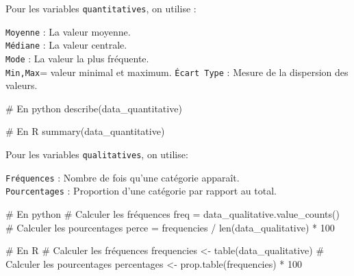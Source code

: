 \documentclass[
  letterpaper,
  DIV=11,
  numbers=noendperiod]{scrartcl}
\newenvironment{Shaded}{\begin{snugshade}}{\end{snugshade}}
\newcommand{\CommentTok}[1]{\textcolor[rgb]{0.37,0.37,0.37}{#1}}
\newcommand{\DecValTok}[1]{\textcolor[rgb]{0.68,0.00,0.00}{#1}}
\newcommand{\FunctionTok}[1]{\textcolor[rgb]{0.28,0.35,0.67}{#1}}
\newcommand{\NormalTok}[1]{\textcolor[rgb]{0.00,0.23,0.31}{#1}}
\newcommand{\OtherTok}[1]{\textcolor[rgb]{0.00,0.23,0.31}{#1}}
\newcommand{\SpecialCharTok}[1]{\textcolor[rgb]{0.37,0.37,0.37}{#1}}
\begin{document}
Pour les variables \texttt{quantitatives}, on utilise :

\texttt{Moyenne} : La valeur moyenne.\\
\texttt{Médiane} : La valeur centrale.\\
\texttt{Mode} : La valeur la plus fréquente.\\
\texttt{Min,Max}= valeur minimal et maximum. \texttt{Écart\ Type} :
Mesure de la dispersion des valeurs.

\begin{Shaded}
\begin{Highlighting}[]
\CommentTok{\# En python}
\FunctionTok{describe}\NormalTok{(data\_quantitative)}
\end{Highlighting}
\end{Shaded}

\begin{Shaded}
\begin{Highlighting}[]
\CommentTok{\# En R }
\FunctionTok{summary}\NormalTok{(data\_quantitative)}
\end{Highlighting}
\end{Shaded}

Pour les variables \texttt{qualitatives}, on utilise:

\texttt{Fréquences} : Nombre de fois qu'une catégorie apparaît.\\
\texttt{Pourcentages} : Proportion d'une catégorie par rapport au total.

\begin{Shaded}
\begin{Highlighting}[]
\CommentTok{\# En python}
\CommentTok{\# Calculer les fréquences}
\NormalTok{freq }\OtherTok{=} \FunctionTok{data\_qualitative.value\_counts}\NormalTok{()}
\CommentTok{\# Calculer les pourcentages}
\NormalTok{perce }\OtherTok{=}\NormalTok{ frequencies }\SpecialCharTok{/} \FunctionTok{len}\NormalTok{(data\_qualitative) }\SpecialCharTok{*} \DecValTok{100}
\end{Highlighting}
\end{Shaded}

\begin{Shaded}
\begin{Highlighting}[]
\CommentTok{\# En R }
\CommentTok{\# Calculer les fréquences}
\NormalTok{frequencies }\OtherTok{\textless{}{-}} \FunctionTok{table}\NormalTok{(data\_qualitative)}
\CommentTok{\# Calculer les pourcentages}
\NormalTok{percentages }\OtherTok{\textless{}{-}} \FunctionTok{prop.table}\NormalTok{(frequencies) }\SpecialCharTok{*} \DecValTok{100}
\end{Highlighting}
\end{Shaded}
\end{document}

